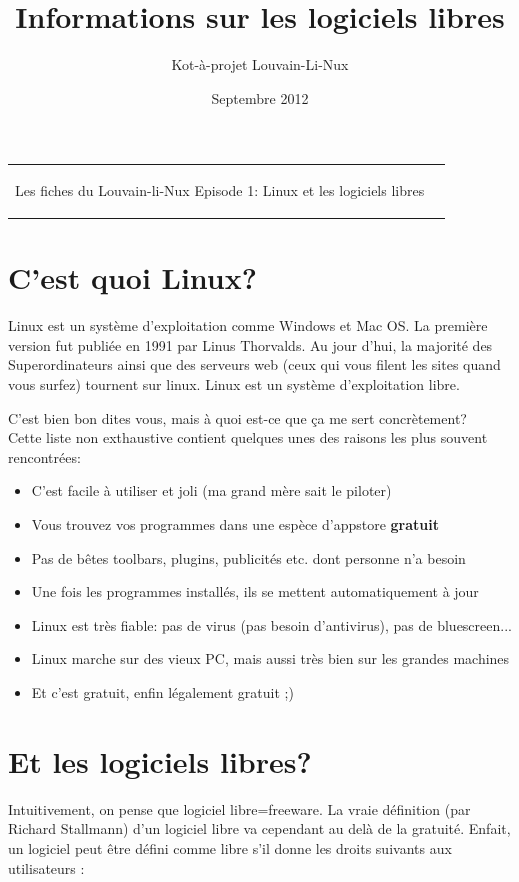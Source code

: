 \documentclass[12pt,a4paper]{article}
\title{Informations sur les logiciels libres}
\author{Kot-à-projet Louvain-Li-Nux}
\date{Septembre 2012}
\begin{document}

\begin{tabular}{p{12cm}r}

\begin{center}{\Large Les fiches du Louvain-li-Nux\linebreak \linebreak
\LARGE Episode 1: Linux et les logiciels libres}\end{center}
&
\usebox{\logollnux}

\end{tabular}


\section*{C'est quoi Linux?}

Linux est un système d'exploitation comme Windows et Mac OS. La première version fut publiée en 1991 par Linus Thorvalds.
Au jour d'hui, la majorité des Superordinateurs ainsi que des serveurs web (ceux qui vous filent les sites quand vous surfez)
tournent sur linux. Linux est un système d'exploitation libre.
\vspace{0.5cm}

C'est bien bon dites vous, mais à quoi est-ce que ça me sert concrètement?\\
Cette liste non exthaustive contient quelques unes des raisons les plus souvent rencontrées:
\begin{itemize}
\item C'est facile à utiliser et joli (ma grand mère sait le piloter)
\item Vous trouvez vos programmes dans une espèce d'appstore \textbf{gratuit}
\item Pas de bêtes toolbars, plugins, publicités etc. dont personne n'a besoin
\item Une fois les programmes installés, ils se mettent automatiquement à jour
\item Linux est très fiable: pas de virus (pas besoin d'antivirus), pas de bluescreen...
\item Linux marche sur des vieux PC, mais aussi très bien sur les grandes machines
\item Et c'est gratuit, enfin légalement gratuit ;)
\end{itemize}

\section*{Et les logiciels libres?}
Intuitivement, on pense que logiciel libre=freeware.
La vraie définition (par Richard Stallmann) d'un logiciel libre va cependant au delà de la gratuité.
Enfait, un logiciel peut être défini comme libre s'il donne les droits suivants aux utilisateurs :
\end{document}
